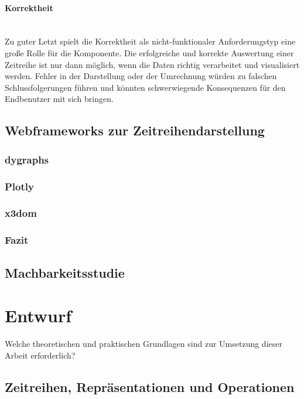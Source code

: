 \documentclass[12pt]{article}
\begin{document}
			\paragraph{Korrektheit} $\;$ \\[0.3cm]
			Zu guter Letzt spielt die Korrektheit als nicht-funktionaler Anforderungstyp
			eine große Rolle für die Komponente. Die erfolgreiche und korrekte Auswertung
			einer Zeitreihe ist nur dann möglich, wenn die Daten richtig verarbeitet
			und visualisiert werden. Fehler in der Darstellung oder der Umrechnung würden
			zu falschen Schlussfolgerungen führen und könnten schwerwiegende Konsequenzen
			für den Endbenutzer mit sich bringen.
			
			\newpage
	\subsection{Webframeworks zur Zeitreihendarstellung}
		\subsubsection{dygraphs}
		\subsubsection{Plotly}
		\subsubsection{x3dom}

		\subsubsection{Fazit}
	\subsection{Machbarkeitsstudie}
\section{Entwurf}
		Welche theoretischen und praktischen Grundlagen sind zur Umsetzung dieser Arbeit erforderlich?
	\subsection{Zeitreihen, Repräsentationen und Operationen}
\end{document}
